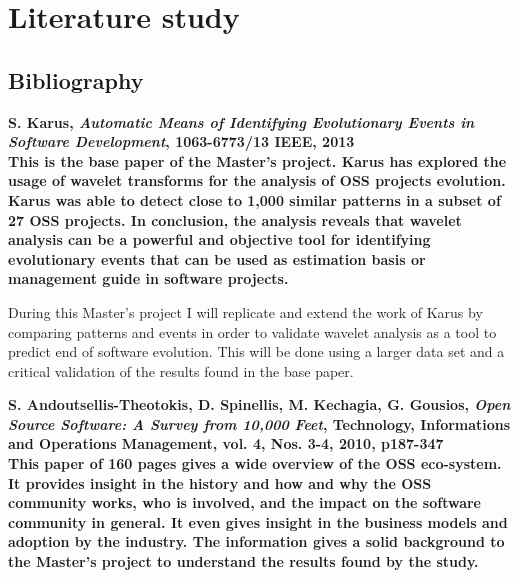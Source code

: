 \section{Literature study}

\subsection{Bibliography}

\begingroup
\renewcommand{\section}[2]{}%

\begin{thebibliography}{99}
	 \bfseries{S. Karus, \emph{Automatic Means of
		Identifying Evolutionary Events in Software Development}, 1063-6773/13 IEEE,
		2013}\rm
		\\
		
		This is the base paper of the Master's project.
		Karus has explored the usage of wavelet transforms for the analysis of OSS
		projects evolution. Karus was able to detect close to 1,000 similar patterns
		in a subset of 27 OSS projects. In conclusion, the analysis reveals that
		wavelet analysis can be a powerful and objective tool for identifying
		evolutionary events that can be used as estimation basis or management guide
		in software projects.

		During this Master's project I will replicate and extend the work of Karus by
		comparing patterns and events in order to validate wavelet analysis as a tool
		to predict end of software evolution. This will be done using a larger data
		set and a critical validation of the results found in the base paper.

	 \bfseries{S. Andoutsellis-Theotokis, D. Spinellis, M.
		Kechagia, G. Gousios, \emph{Open Source Software: A Survey from 10,000
		Feet}, Technology, Informations and Operations Management, vol. 4, Nos.
		3-4, 2010, p187-347}\rm
		\\
		
		This paper of 160 pages gives a wide overview of the OSS eco-system. It
		provides insight in the history and how and why the OSS community works, who
		is involved, and the impact on the software community in general. It even
		gives insight in the business models and adoption by the industry. The
		information gives a solid background to the Master's project to understand
		the results found by the study.


\end{thebibliography}
